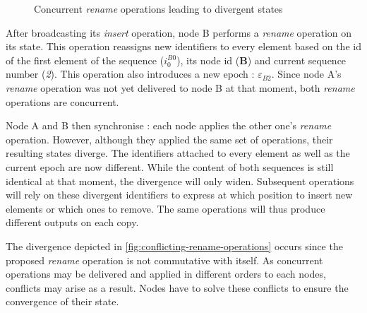 \documentclass[10pt,journal,compsoc]{IEEEtran}
\let\MYoriglatexcaption\caption
\renewcommand{\caption}[2][\relax]{\MYoriglatexcaption[#2]{#2}}
\newcommand{\trm}[1]{\mathit{#1}}
\newcommand{\id}[3]{$\trm{#1}^{\trm{#2}}_{\trm{#3}}$}
\newcommand{\epoch}[1]{$\varepsilon_{#1}$}
\begin{document}
\begin{figure}[t!]
    \caption{Concurrent \emph{rename} operations leading to divergent states}
    \label{fig:conflicting-rename-operations}
\end{figure}

After broadcasting its \emph{insert} operation, node B performs a \emph{rename} operation on its state.
This operation reassigns new identifiers to every element based on the id of the first element of the sequence (\id{i}{B0}{0}), its node id (\textbf{B}) and current sequence number (\emph{2}).
This operation also introduces a new epoch : \epoch{B2}.
Since node A's \emph{rename} operation was not yet delivered to node B at that moment, both \emph{rename} operations are concurrent.

Node A and B then synchronise : each node applies the other one's \emph{rename} operation.
However, although they applied the same set of operations, their resulting states diverge.
The identifiers attached to every element as well as the current epoch are now different.
While the content of both sequences is still identical at that moment, the divergence will only widen.
Subsequent operations will rely on these divergent identifiers to express at which position to insert new elements or which ones to remove.
The same operations will thus produce different outputs on each copy.

The divergence depicted in \autoref{fig:conflicting-rename-operations} occurs since the proposed \emph{rename} operation is not commutative with itself.
As concurrent operations may be delivered and applied in different orders to each nodes, conflicts may arise as a result.
Nodes have to solve these conflicts to ensure the convergence of their state.
\end{document}
